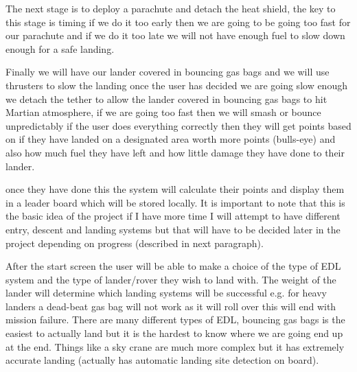 \documentclass[11pt,fleqn,twoside]{article}
\begin{document}
The next stage is to deploy a parachute and detach the heat shield, the key to this stage is timing if we do it too early then we are going to be going too fast for our parachute and if we do it too late we will not have enough fuel to slow down enough for a safe landing.

Finally we will have our lander covered in bouncing gas bags and we will use thrusters to slow the landing once the user has decided we are going slow enough we detach the tether to allow the lander covered in bouncing gas bags to hit Martian atmosphere, if we are going too fast then we will smash or bounce unpredictably if the user does everything correctly then they will get points based on if they have landed on a designated area worth more points (bulls-eye) and also how much fuel they have left and how little damage they have done to their lander.

once they have done this the system will calculate their points and display them in a leader board which will be stored locally. It is important to note that this is the basic idea of the project if I have more time I will attempt to have different entry, descent and landing systems but that will have to be decided later in the project depending on progress (described in next paragraph).

After the start screen the user will be able to make a choice of the type of EDL system and the type of lander/rover they wish to land with. The weight of the lander will determine which landing systems will be successful e.g. for heavy landers a dead-beat gas bag will not work as it will roll over this will end with mission failure. There are many different types of EDL, bouncing gas bags is the easiest to actually land but it is the hardest to know where we are going end up at the end. Things like a sky crane are much more complex but it has extremely accurate landing (actually has automatic landing site detection on board).
\end{document}
